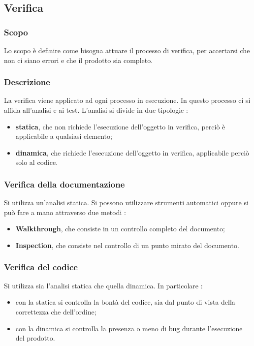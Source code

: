 \subsection{Verifica}
\subsubsection{Scopo}
Lo scopo è definire come bisogna attuare il processo di verifica, per accertarsi che non ci siano errori e che il prodotto sia completo.

\subsubsection{Descrizione}
La verifica viene applicato ad ogni processo in esecuzione. In questo processo ci si affida all’analisi e ai test. L’analisi si divide in due tipologie :
\begin{itemize}
\item \textbf{statica}, che non richiede l’esecuzione dell’oggetto in verifica, perciò è applicabile a qualsiasi elemento;
\item \textbf{dinamica}, che richiede l’esecuzione dell’oggetto in verifica, applicabile perciò solo al codice.
\end{itemize}

\subsubsection{Verifica della documentazione}
Si utilizza un’analisi statica. Si possono utilizzare strumenti automatici oppure si può fare a mano attraverso due metodi :
\begin{itemize}
\item \textbf{Walkthrough}, che consiste in un controllo completo del documento;
\item \textbf{Inspection}, che consiste nel controllo di un punto mirato del documento.
\end{itemize}

\subsubsection{Verifica del codice}
Si utilizza sia l’analisi statica che quella dinamica. In particolare :
\begin{itemize}
\item con la statica si controlla la bontà del codice, sia dal punto di vista della correttezza che dell’ordine;
\item con la dinamica si controlla la presenza o meno di bug durante l’esecuzione del prodotto.
\end{itemize}

